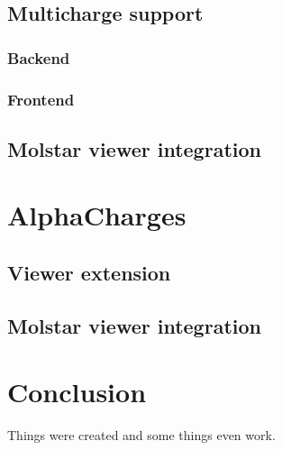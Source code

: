 \documentclass[
  digital,     %
  oneside,     %
  nosansbold,  %
  nocolorbold, %
  lof,         %
  lot,         %
]{fithesis4}
\begin{document}
\section{Multicharge support}

\subsection{Backend}

\subsection{Frontend}

\section{Molstar viewer integration}

\chapter{AlphaCharges}
\section{Viewer extension}
\section{Molstar viewer integration}


\chapter*{Conclusion}

Things were created and some things even work.
\end{document}

